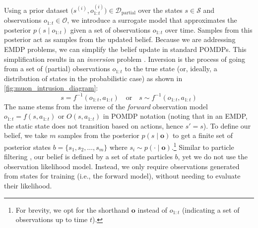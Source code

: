 Using a prior dataset $\big(s^{(i)}, o^{(i)}_{1:t}\big) \in \mathcal{D}_\text{partial}$ over the states $s \in \mathcal{S}$ and observations $o_{1:t} \in \mathcal{O}$, we introduce a surrogate model that approximates the posterior $p(s \mid o_{1:t})$ given a set of observations $o_{1:t}$ over time.
Samples from this posterior act as samples from the updated belief.
Because we are addressing EMDP problems, we can simplify the belief update in standard POMDPs.
This simplification results in an \textit{inversion} problem \cite{tarantola1987inverse}.
Inversion is the process of going from a set of (partial) observations $o_{1:t}$ to the true state (or, ideally, a distribution of states in the probabilistic case) as shown in \cref{fig:muon_intrusion_diagram}:
\[
    s = f^{-1}(o_{1:t}, a_{1:t}) \quad \text{or} \quad s \sim f^{-1}(o_{1:t}, a_{1:t})
\]
The name stems from the inverse of the \textit{forward} observation model $o_{1:t} = f(s, a_{1:t})$ or $O(s, a_{1:t})$ in POMDP notation (noting that in an EMDP, the static state does not transition based on actions, hence $s' = s$).
To define our belief, we take $m$ samples from the posterior $p(s \mid \mathbf{o})$ to get a finite set of posterior states $b = \{ s_1, s_2, \ldots, s_m \}$ where $s_i \sim p(\cdot \mid \mathbf{o})$.\footnote{For brevity, we opt for the shorthand $\mathbf{o}$ instead of $o_{1:t}$ (indicating a set of observations up to time $t$).}
Similar to particle filtering \cite{thrun2005probabilistic}, our belief is defined by a set of state particles $b$, yet we do not use the observation likelihood model.
Instead, we only require observations generated from states for training (i.e., the forward model), without needing to evaluate their likelihood.

